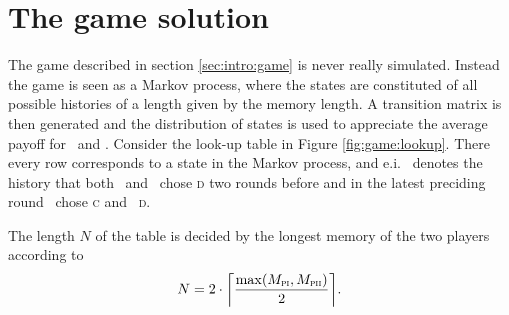 \section{The game solution}\label{sec:game}
The game described in section \ref{sec:intro:game} is never really simulated. Instead the game is seen as a Markov process, where the states are constituted of all possible histories of a length given by the memory length. A transition matrix is then generated and the distribution of states is used to appreciate the average payoff for \pone\ and \ptwo. Consider the look-up table in Figure \ref{fig:game:lookup}. There every row corresponds to a state in the Markov process, and e.i.\  denotes the history that both \pone\ and \ptwo\ chose \textsc{d} two rounds before and in the latest preciding round \pone\ chose \textsc{c} and \ptwo\ \textsc{d}.

The length $N$ of the table  is decided by the longest memory of the two players according to
\begin{equation*}
N = 2\cdot{\left\lceil{\frac{\max(M_{\textsc{pi}}, M_{\textsc{pii}})}{2}}\right\rceil}.
\end{equation*}

